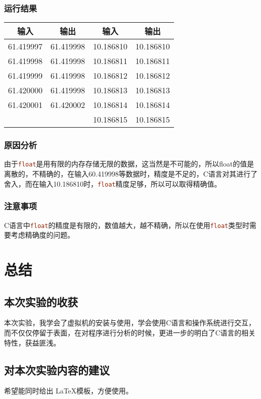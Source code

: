 \subsubsection{运行结果}
\begin{tabular}{|c|c|c|c|}
	\hline 
	输入 & 输出 & 输入 & 输出 \\ 
	\hline 
	61.419997 & 61.419998 & 10.186810 & 10.186810 \\ 
	\hline 
	61.419998 & 61.419998 & 10.186811 & 10.186811 \\ 
	\hline 
	61.419999 & 61.419998 & 10.186812 & 10.186812 \\ 
	\hline 
	61.420000 & 61.419998 & 10.186813 & 10.186813 \\ 
	\hline 
	61.420001 & 61.420002 & 10.186814 & 10.186814 \\ 
	\hline
	          &           & 10.186815 & 10.186815 \\ 
	\hline 
\end{tabular} 

\subsubsection{原因分析}
由于\lstinline[language=c]|float|是用有限的内存存储无限的数据，这当然是不可能的，所以float的值是离散的，不精确的，在输入60.419998等数据时，精度是不足的，C语言对其进行了舍入，而在输入10.186810时，\lstinline[language=c]|float|精度足够，所以可以取得精确值。

\subsubsection{注意事项}
C语言中\lstinline[language=c]|float|的精度是有限的，数值越大，越不精确，所以在使用\lstinline[language=c]|float|类型时需要考虑精确度的问题。


\section{总结}
\subsection{本次实验的收获}
本次实验，我学会了虚拟机的安装与使用，学会使用C语言和操作系统进行交互，而不仅仅停留于表面，在对程序进行分析的时候，更进一步的明白了C语言的相关特性，获益匪浅。

\subsection{对本次实验内容的建议} 
希望能同时给出 \LaTeX 模板，方便使用。


